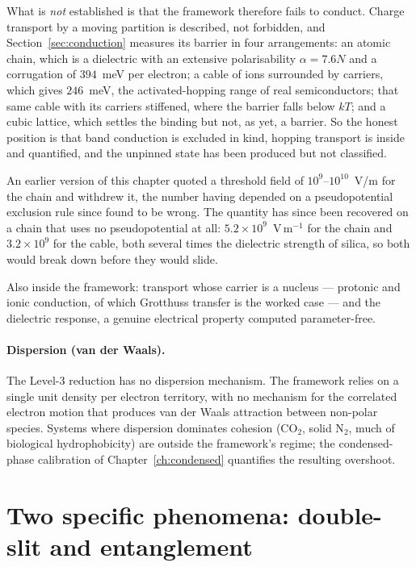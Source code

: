 What is \emph{not} established is that the framework therefore fails to conduct. Charge transport by
a moving partition is described, not forbidden, and Section~\ref{sec:conduction} measures its
barrier in four arrangements: an atomic chain, which is a dielectric with an extensive polarisability
$\alpha=7.6N$ and a corrugation of $394$~meV per electron; a cable of ions surrounded by carriers,
which gives $246$~meV, the activated-hopping range of real semiconductors; that same cable with its
carriers stiffened, where the barrier falls below $kT$; and a cubic lattice, which settles the
binding but not, as yet, a barrier. So the honest position is that band conduction is excluded in
kind, hopping transport is inside and quantified, and the unpinned state has been produced but not
classified.

An earlier version of this chapter quoted a threshold field of $10^{9}$--$10^{10}$~V/m for the
chain and withdrew it, the number having depended on a pseudopotential exclusion rule since found to
be wrong. The quantity has since been recovered on a chain that uses no pseudopotential at all:
$5.2\times10^{9}$~V\,m$^{-1}$ for the chain and $3.2\times10^{9}$ for the cable, both several times
the dielectric strength of silica, so both would break down before they would slide.

Also inside the framework: transport whose carrier is a nucleus --- protonic and ionic conduction,
of which Grotthuss transfer is the worked case --- and the dielectric response, a genuine electrical
property computed parameter-free.

\paragraph{Dispersion (van der Waals).}
The Level-3 reduction has no dispersion mechanism. The framework relies on a single unit density per electron territory, with no mechanism for the correlated electron motion that produces van der Waals attraction between non-polar species. Systems where dispersion dominates cohesion (CO$_2$, solid N$_2$, much of biological hydrophobicity) are outside the framework's regime; the condensed-phase calibration of Chapter~\ref{ch:condensed} quantifies the resulting overshoot.

\section{Two specific phenomena: double-slit and entanglement}\label{sec:double-slit-entanglement}


